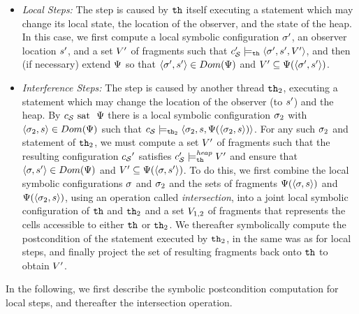 \begin{itemize}
\item
  {\it Local Steps:} The step
  is caused by ${\tt th}$ itself executing a statement
  which may change its local state, the location of the observer,
  and the state of the heap.
  In this case, we first compute a local symbolic configuration $\sigma'$,
  an observer location $s'$, and a set $V'$ of fragments such that
$c_{\mathcal S}' \models_{{\tt th}} \left\langle\sigma',s',V'\right\rangle$,
  and then (if necessary) extend $\Psi$ so that
  $\left\langle\sigma',s'\right\rangle \in Dom(\Psi)$ and
  $ V' \subseteq \Psi(\left\langle\sigma',s'\right\rangle)$.
\item
  {\it Interference Steps:} The step is caused by another thread ${\tt th}_2$,
  executing a statement
  which may change the location of the observer (to $s'$)
  and the heap.
  By $c_{\mathcal S} \mbox{ sat \ } \Psi$
  there is a local symbolic configuration $\sigma_2$
  with $\left\langle\sigma_2,s\right\rangle \in Dom(\Psi)$ such that
  $c_{\mathcal S} \models_{{\tt th}_2} \left\langle\sigma_2,s,\Psi(\left\langle\sigma_2,s\right\rangle)\right\rangle$.
  For any such $\sigma_2$ and statement of ${\tt th}_2$,
  we must compute a set $V'$ of fragments such that
  the resulting configuration ${c_{\mathcal S}}'$ satisfies
  $c_{\mathcal S}' \models_{{\tt th}}^{\mathit{heap}} V'$ and 
  ensure that $\left\langle\sigma,s'\right\rangle \in Dom(\Psi)$ and
  $V' \subseteq \Psi(\left\langle\sigma,s'\right\rangle)$.
  To do this, we first combine the local symbolic configurations
  $\sigma$ and $\sigma_2$ and the sets of fragments
  $\Psi(\left\langle\sigma,s\right\rangle)$ and
  $\Psi(\left\langle\sigma_2,s\right\rangle)$, using an
  operation called {\em intersection}, into
  a joint local symbolic configuration of ${\tt th}$ and ${\tt th}_2$ and
  a set $V_{1,2}$ of fragments that represents the cells accessible
  to either ${\tt th}$ or ${\tt th}_2$.
  We thereafter symbolically compute the postcondition of the statement
  executed by ${\tt th}_2$, in the same was as for local steps,
  and finally project the set of resulting fragments back onto ${\tt th}$
  to obtain $V'$.
\end{itemize}
In the following, we first describe the symbolic postcondition computation for
local steps, and thereafter the intersection operation.


